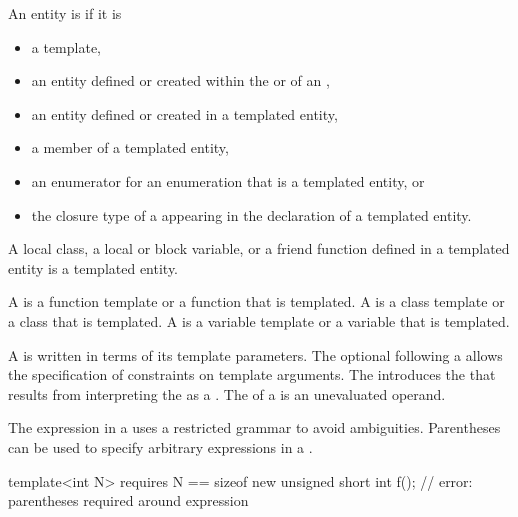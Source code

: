 \pnum
{}%
An entity is 
if it is
\begin{itemize}
\item a template,
\item an entity defined or created
      within the
       or 
      of an ,
\item an entity defined or created in a templated entity,
\item a member of a templated entity,
\item an enumerator for an enumeration that is a templated entity, or
\item the closure type of a 
      appearing in the declaration of a templated entity.
\end{itemize}

\begin{note}
A local class, a local or block variable, or a friend function defined in a
templated entity is a templated entity.
\end{note}

A  is
a function template or a function that is templated.
A  is
a class template or a class that is templated.
A  is
a variable template or a variable that is templated.

\pnum
A  is written
in terms of its template parameters.
The optional  following a
 allows the specification of
constraints on template arguments.
The  introduces the
 that results from interpreting
the  as a
.
The  of a
 is an unevaluated operand.
\begin{note}
The expression in a 
uses a restricted grammar to avoid ambiguities.
Parentheses can be used to specify arbitrary expressions
in a .
\begin{example}
\begin{codeblock}
template<int N> requires N == sizeof new unsigned short
int f();            // error: parentheses required around \tcode{==} expression
\end{codeblock}
\end{example}
\end{note}

